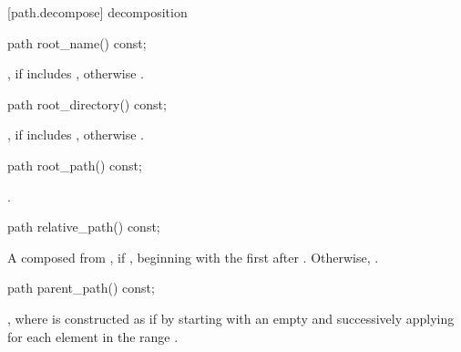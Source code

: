 [path.decompose]{ decomposition}

%
\begin{itemdecl}
path root_name() const;
\end{itemdecl}

\begin{itemdescr}
\pnum
\returns {}, if  includes , otherwise .
\end{itemdescr}

%
\begin{itemdecl}
path root_directory() const;
\end{itemdecl}

\begin{itemdescr}
\pnum
\returns {}, if  includes , otherwise .
\end{itemdescr}

%
\begin{itemdecl}
path root_path() const;
\end{itemdecl}

\begin{itemdescr}
\pnum
\returns {}.
\end{itemdescr}

%
\begin{itemdecl}
path relative_path() const;
\end{itemdecl}

\begin{itemdescr}
\pnum
\returns A  composed from , if , beginning
with the first  after . Otherwise, .
\end{itemdescr}

%
\begin{itemdecl}
path parent_path() const;
\end{itemdecl}

\begin{itemdescr}
\pnum
\returns {},
where  is constructed as if by
  starting with an empty  and successively applying  for each element in the range
  .
\end{itemdescr}

